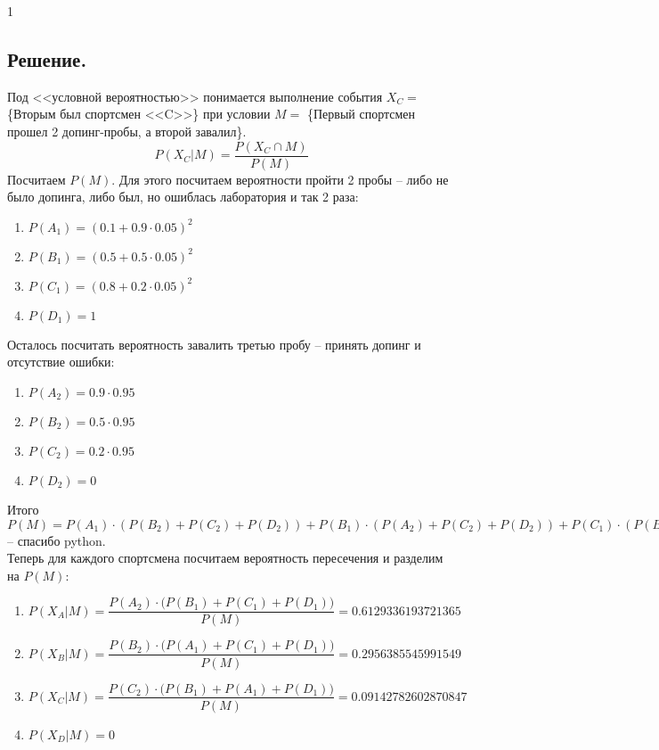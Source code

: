 \documentclass[a4paper, 12pt]{article}
\begin{document}
\begin{spacing}{1}
\subsection{Решение.} Под <<условной вероятностью>> понимается
выполнение события $X_C =$ \{Вторым был спортсмен <<C>>\} при 
условии $M =$ \{Первый спортсмен прошел 2 допинг-пробы,
а второй завалил\}.
$$
P(X_C | M) = \dfrac{P(X_C \cap M)}{P(M)}
$$
Посчитаем $P(M)$. Для этого посчитаем вероятности пройти 2 пробы -- либо не было допинга, либо был, но ошиблась лаборатория и так 2 раза:
\begin{enumerate}
	\item $P(A_1) = (0.1 + 0.9 \cdot 0.05)^2$
	\item $P(B_1) = (0.5 + 0.5 \cdot 0.05)^2$
	\item $P(C_1) = (0.8 + 0.2 \cdot 0.05)^2$
	\item $P(D_1) = 1$
\end{enumerate}
Осталось посчитать вероятность завалить третью пробу -- принять допинг и отсутствие ошибки:
\begin{enumerate}
	\item $P(A_2) = 0.9 \cdot 0.95$
	\item $P(B_2) = 0.5 \cdot 0.95$
	\item $P(C_2) = 0.2 \cdot 0.95$
	\item $P(D_2) = 0$
\end{enumerate}
Итого $P(M) = P(A_1)\cdot(P(B_2)+P(C_2)+P(D_2)) + P(B_1)\cdot(P(A_2)+P(C_2)+P(D_2)) + P(C_1)\cdot(P(B_2)+P(A_2)+P(D_2)) + P(D_1)\cdot(P(B_2)+P(C_2)+P(A_2)) = 2.69462275$ -- спасибо python.\\
Теперь для каждого спортсмена посчитаем вероятность пересечения и разделим на $P(M)$:
\begin{enumerate}
	\item[A:] $P(X_A | M) = \dfrac{P(A_2)\cdot\bigg(P(B_1)+P(C_1) + P(D_1)\bigg)}{P(M)} = 0.6129336193721365$
	\item[B:] $P(X_B | M) = \dfrac{P(B_2)\cdot\bigg(P(A_1)+P(C_1) + P(D_1)\bigg)}{P(M)} =0.2956385545991549$
	\item[C:] $P(X_C | M) = \dfrac{P(C_2)\cdot\bigg(P(B_1)+P(A_1) + P(D_1)\bigg)}{P(M)} = 0.09142782602870847$
	\item[D:] $P(X_D | M) = 0$ 
	
\end{enumerate}
\end{spacing}
\end{document}
